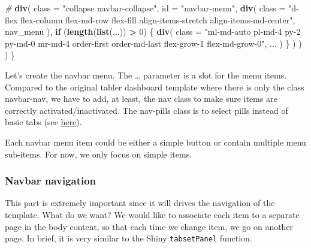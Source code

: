 \documentclass[]{book}
\newenvironment{Shaded}{\begin{snugshade}}{\end{snugshade}}
\newcommand{\CommentTok}[1]{\textcolor[rgb]{0.56,0.35,0.01}{\textit{#1}}}
\newcommand{\ControlFlowTok}[1]{\textcolor[rgb]{0.13,0.29,0.53}{\textbf{#1}}}
\newcommand{\DataTypeTok}[1]{\textcolor[rgb]{0.13,0.29,0.53}{#1}}
\newcommand{\DecValTok}[1]{\textcolor[rgb]{0.00,0.00,0.81}{#1}}
\newcommand{\KeywordTok}[1]{\textcolor[rgb]{0.13,0.29,0.53}{\textbf{#1}}}
\newcommand{\NormalTok}[1]{#1}
\newcommand{\OperatorTok}[1]{\textcolor[rgb]{0.81,0.36,0.00}{\textbf{#1}}}
\newcommand{\StringTok}[1]{\textcolor[rgb]{0.31,0.60,0.02}{#1}}
\begin{document}
\begin{Shaded}
\begin{Highlighting}[]
      \CommentTok{# }
      \KeywordTok{div}\NormalTok{(}
        \DataTypeTok{class =} \StringTok{"collapse navbar-collapse"}\NormalTok{, }
        \DataTypeTok{id =} \StringTok{"navbar-menu"}\NormalTok{,}
        \KeywordTok{div}\NormalTok{(}
          \DataTypeTok{class =} \StringTok{"d-flex flex-column flex-md-row flex-fill align-items-stretch align-items-md-center"}\NormalTok{,}
\NormalTok{          nav_menu}
\NormalTok{        ),}
        \ControlFlowTok{if}\NormalTok{ (}\KeywordTok{length}\NormalTok{(}\KeywordTok{list}\NormalTok{(...)) }\OperatorTok{>}\StringTok{ }\DecValTok{0}\NormalTok{) \{}
          \KeywordTok{div}\NormalTok{(}
            \DataTypeTok{class =} \StringTok{"ml-md-auto pl-md-4 py-2 py-md-0 mr-md-4 order-first order-md-last flex-grow-1 flex-md-grow-0"}\NormalTok{, }
\NormalTok{            ...}
\NormalTok{          )}
\NormalTok{        \}}
\NormalTok{      )}
\NormalTok{    )}
\NormalTok{  )}
\NormalTok{\}}
\end{Highlighting}
\end{Shaded}

Let's create the navbar menu. The \ldots{} parameter is a slot for the menu items. Compared to the original tabler dashboard template where there is only the class navbar-nav, we have to add, at least, the nav class to make sure items are correctly activated/inactivated. The nav-pills class is to select pills instead of basic tabs (see \href{https://getbootstrap.com/docs/4.0/components/navs/}{here}).

\begin{Shaded}
\end{Shaded}

Each navbar menu item could be either a simple button or contain multiple menu sub-items. For now, we only focus on simple items.

\hypertarget{navbar-navigation}{%
\subsubsection{Navbar navigation}\label{navbar-navigation}}

This part is extremely important since it will drives the navigation of the template. What do we want? We would like to associate each item to a separate page in the body content, so that each time we change item, we go on another page. In brief, it is very similar to the Shiny \texttt{tabsetPanel} function.
\end{document}
